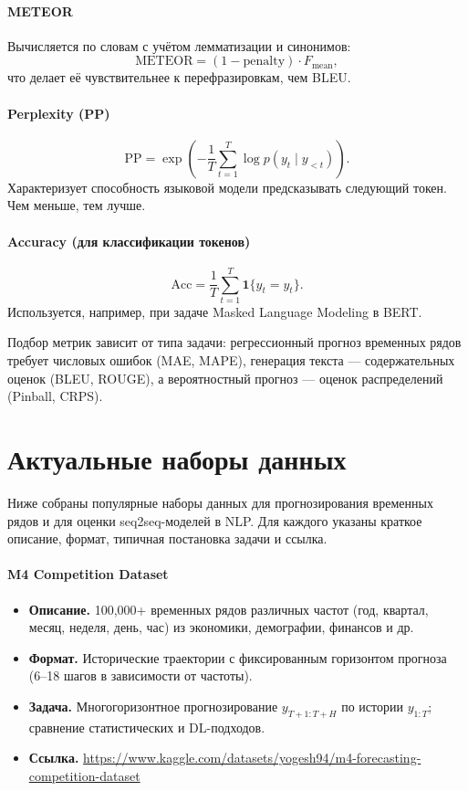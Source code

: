 \documentclass[12pt,a4paper]{article}
\begin{document}
\paragraph{METEOR}
Вычисляется по словам с учётом лемматизации и синонимов:
\[
\mathrm{METEOR} =
(1 - \mathrm{penalty}) \cdot F_{\mathrm{mean}},
\]
что делает её чувствительнее к перефразировкам, чем BLEU.

\paragraph{Perplexity (PP)}
\[
\mathrm{PP} =
\exp\left(
-\frac{1}{T}\sum_{t=1}^{T}
\log p(y_t \mid y_{<t})
\right).
\]
Характеризует способность языковой модели предсказывать следующий токен. Чем меньше, тем лучше.

\paragraph{Accuracy (для классификации токенов)}
\[
\mathrm{Acc} =
\frac{1}{T}
\sum_{t=1}^{T}
\mathbf{1}\{\hat y_t = y_t\}.
\]
Используется, например, при задаче Masked Language Modeling в BERT.

\medskip
Подбор метрик зависит от типа задачи: регрессионный прогноз временных рядов требует числовых ошибок (MAE, MAPE), генерация текста — содержательных оценок (BLEU, ROUGE), а вероятностный прогноз — оценок распределений (Pinball, CRPS).


\section{Актуальные наборы данных}

Ниже собраны популярные наборы данных для прогнозирования временных рядов и для оценки seq2seq-моделей в NLP. Для каждого указаны краткое описание, формат, типичная постановка задачи и ссылка.

\paragraph{M4 Competition Dataset}
\begin{itemize}
  \item \textbf{Описание.} 100{,}000+ временных рядов различных частот (год, квартал, месяц, неделя, день, час) из экономики, демографии, финансов и др.
  \item \textbf{Формат.} Исторические траектории с фиксированным горизонтом прогноза (6--18 шагов в зависимости от частоты).
  \item \textbf{Задача.} Многогоризонтное прогнозирование $y_{T+1:T+H}$ по истории $y_{1:T}$; сравнение статистических и DL-подходов.
  \item \textbf{Ссылка.} \href{https://www.kaggle.com/datasets/yogesh94/m4-forecasting-competition-dataset}{https://www.kaggle.com/datasets/yogesh94/m4-forecasting-competition-dataset}
\end{itemize}
\end{document}

